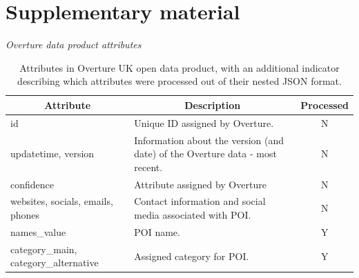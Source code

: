 \documentclass[
]{article}
\author{}
\date{}
\begin{document}
\section*{Supplementary material}\label{supplementary-material}

\renewcommand{\thetable}{\roman{table}}
\renewcommand{\thefigure}{\roman{figure}}

\emph{Overture data product attributes}

\def\arraystretch{1.5}
\begin{table}[H]
\caption{\label{tablei} Attributes in Overture UK open data product, with an additional indicator describing which attributes were processed out of their nested JSON format.}
\centering
\bigskip
\begin{tabular}{p{6cm}p{6cm}c}
\hline
\multicolumn{1}{c}{\textbf{Attribute}}                                                                        & \multicolumn{1}{c}{\textbf{Description}}                                                                     & \textbf{Processed} \\
\hline
id                                                                                                   & Unique ID assigned by Overture.                                                                     & N         \\
updatetime, version                                                                                  & Information about the version (and date) of the Overture data - most recent.                        & N         \\
confidence                                                                                           & Attribute assigned by Overture                                                                      & N         \\
websites, socials, emails, phones                                                                    & Contact information and social media associated with POI.                                           & N         \\
names\_value                                                                                         & POI name.                                                                                           & Y         \\
category\_main, category\_alternative                                                                & Assigned category for POI.                                                                          & Y         \\

\end{tabular}
\end{table}
\end{document}
